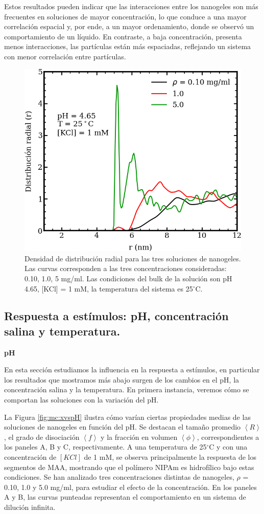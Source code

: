 	Estos resultados pueden indicar que las interacciones entre los nanogeles son m\'as frecuentes en soluciones de mayor concentraci\'on, lo que conduce a una mayor correlaci\'on espacial y, por ende, a un mayor ordenamiento, donde se observ\'o un comportamiento de un l\'iquido. En contraste, a baja concentraci\'on, presenta menos interacciones, las part\'iculas est\'an m\'as espaciadas, reflejando un sistema con menor correlaci\'on entre part\'iculas.
	
	\begin{figure}
		\centering
		\includegraphics[width=0.45\linewidth]{Figures/graph-mc/rdf.png}
		\caption{Densidad de distribuci\'on radial para las tres soluciones de nanogeles. Las curvas corresponden a las tres concentraciones consideradas: 0.10, 1.0, 5 mg/ml. Las condiciones del bulk de la soluci\'on son pH 4.65, [KCl] = 1 mM, la temperatura del sistema es 25$^\circ$C.}
		\label{fig:mc:rdf}
	\end{figure}
	
	
	
	\subsection{Respuesta a est\'imulos: pH, concentraci\'on salina y temperatura.}\label{sec:mc:phs_salt_temp}
	
	\textbf{pH}
	
	En esta secci\'on estudiamos la influencia en la respuesta a est\'imulos, en particular los resultados que mostramos m\'as abajo surgen de los cambios en el pH, la concentraci\'on salina y la temperatura. En primera instancia, veremos c\'omo se comportan las soluciones con la variaci\'on del pH. %
	
	La Figura \ref{fig:mc:xvspH} ilustra c\'omo var\'ian ciertas propiedades medias de las soluciones de nanogeles en funci\'on del pH. Se destacan el tama\~no promedio $\left<R\right>$, el grado de disociaci\'on $\left<f\right>$ y la fracci\'on en volumen $\left<\phi\right>$, correspondientes a los paneles A, B y C, respectivamente. A una temperatura de 25$^\circ$C y con una concentraci\'on de $[KCl]$ de 1 mM, se observa principalmente la respuesta de los segmentos de MAA, mostrando que el pol\'imero NIPAm es hidrof\'ilico bajo estas condiciones. Se han analizado tres concentraciones distintas de nanogeles, $\rho$ = 0.10, 1.0 y 5.0 mg/ml, para estudiar el efecto de la concentraci\'on. En los paneles A y B, las curvas punteadas representan el comportamiento en un sistema de diluci\'on infinita.
	
